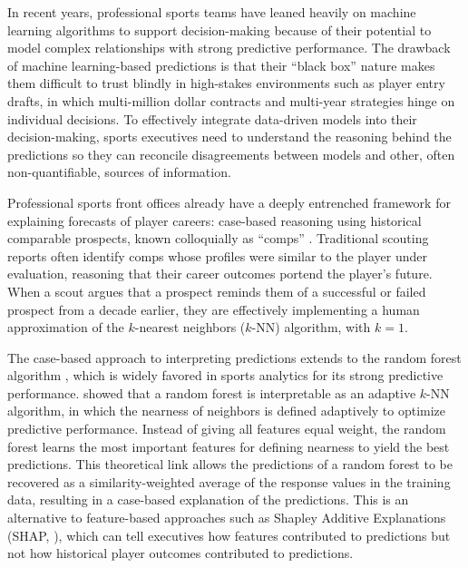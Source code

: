 \documentclass[Review, sageh, times, doublespace]{sagej}
\begin{document}
  In recent years, professional sports teams have leaned heavily on machine learning algorithms to support decision-making because of their potential to model complex relationships with strong predictive performance. The drawback of machine learning-based predictions is that their ``black box'' nature makes them difficult to trust blindly in high-stakes environments such as player entry drafts, in which multi-million dollar contracts and multi-year strategies hinge on individual decisions. To effectively integrate data-driven models into their decision-making, sports executives need to understand the reasoning behind the predictions so they can reconcile disagreements between models and other, often non-quantifiable, sources of information.

  Professional sports front offices already have a deeply entrenched framework for explaining forecasts of player careers: case-based reasoning using historical comparable prospects, known colloquially as ``comps'' \citep{sikkema_2025_2025}. Traditional scouting reports often identify comps whose profiles were similar to the player under evaluation, reasoning that their career outcomes portend the player's future. When a scout argues that a prospect reminds them of a successful or failed prospect from a decade earlier, they are effectively implementing a human approximation of the $k$-nearest neighbors ($k$-NN) algorithm, with $k = 1$.

  The case-based approach to interpreting predictions extends to the random forest algorithm \citep{breiman_random_2001}, which is widely favored in sports analytics for its strong predictive performance. \citet{lin_random_2006} showed that a random forest is interpretable as an adaptive $k$-NN algorithm, in which the nearness of neighbors is defined adaptively to optimize predictive performance. Instead of giving all features equal weight, the random forest learns the most important features for defining nearness to yield the best predictions. This theoretical link allows the predictions of a random forest to be recovered as a similarity-weighted average of the response values in the training data, resulting in a case-based explanation of the predictions. This is an alternative to feature-based approaches such as Shapley Additive Explanations (SHAP, \citealp{lundberg_unified_2017}), which can tell executives how features contributed to predictions but not how historical player outcomes contributed to predictions.
\end{document}
